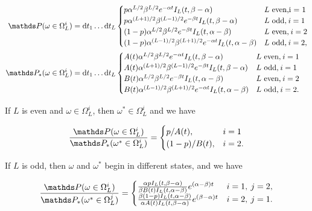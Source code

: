 \begin{align}
\bP(\omega \in \Omega^i_L) &=\rmd t_1 \ldots \rmd t_L \begin{cases}p\alpha^{L/2}\beta^{L/2}e^{-\alpha t}I_L(t,\beta - \alpha) & \text{$L$ even,i = 1}\\ 
p\alpha^{(L+1)/2}\beta^{(L-1)/2}e^{-\beta t}I_L(t,\beta - \alpha) & \text{$L$ odd,\:$i = 1$} \\ 
(1-p)\alpha^{L/2}\beta^{L/2}e^{-\beta t}I_L(t,\alpha - \beta) & \text{$L$ even,\:$i = 2$}\\ 
(1-p)\alpha^{(L-1)/2}\beta^{(L+1)/2}e^{-\alpha t}I_L(t,\alpha - \beta) & \text{$L$ odd,\:$i = 2$},\end{cases} \\ 
\bP_\ast(\omega \in \Omega^i_L) &=\rmd t_1 \ldots \rmd t_L \begin{cases}A(t)\alpha^{L/2}\beta^{L/2}e^{-\alpha t}I_L(t,\beta - \alpha) & \text{$L$ even,\:$i = 1$}\\ 
A(t)\alpha^{(L+1)/2}\beta^{(L-1)/2}e^{-\beta t}I_L(t,\beta - \alpha) & \text{$L$ odd,\:$i = 1$} \\ 
B(t)\alpha^{L/2}\beta^{L/2}e^{-\beta t}I_L(t,\alpha - \beta) & \text{$L$ even,\:$i = 2$}\\ 
B(t)\alpha^{(L-1)/2}\beta^{(L+1)/2}e^{-\alpha t}I_L(t,\alpha - \beta) & \text{$L$ odd,\:$i = 2$}.\end{cases}
\end{align}

If $L$ is even and $\omega \in \Omega^i_L$, then $\omega^\ast \in \Omega_L^i$ and we have 

\begin{align}\label{prob-ratio-even}
\frac{\bP(\omega \in \Omega^i_L)}{\bP_\ast(\omega^\ast \in \Omega^i_L)} = \begin{cases}p/A(t), & i = 1 \\ (1-p)/B(t), & i=2.\end{cases}
\end{align}

If $L$ is odd, then $\omega$ and $\omega^\ast$ begin in different states, and we have

\begin{align}\label{prob-ratio-odd}
\frac{\bP(\omega \in \Omega^i_L)}{\bP_\ast(\omega^\ast \in \Omega^j_L)} = \begin{cases}\frac{\alpha pI_L(t,\beta - \alpha)}{\beta B(t)I_L(t,\alpha - \beta)}e^{(\alpha - \beta)t} & i = 1, \: j = 2, \\ 
\frac{\beta(1-p) I_L(t,\alpha - \beta)}{\alpha A(t) I_L(t,\beta - \alpha)}e^{(\beta - \alpha)t}& i=2, \: j=1.\end{cases}
\end{align}

